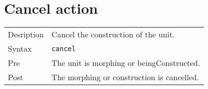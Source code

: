 \section{Cancel action}
\begin{tabularx}{\textwidth}{lX}
 Desription & Cancel the construction of the unit. \\
 Syntax & \verb|cancel| \\
 Pre & The unit is morphing or beingConstructed. \\
 Post & The morphing or construction is cancelled.
\end{tabularx}

